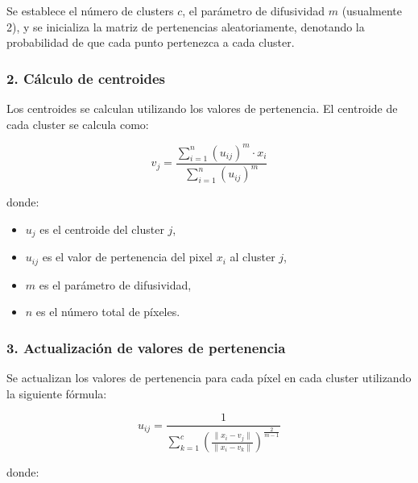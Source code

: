 Se establece el número de clusters $c$, el parámetro de difusividad $m$ (usualmente 2), y se inicializa la matriz de pertenencias aleatoriamente, denotando la probabilidad de que cada punto pertenezca a cada cluster.

\subsubsection{2. Cálculo de centroides}

Los centroides se calculan utilizando los valores de pertenencia. El centroide de cada cluster se calcula como: 

$$v_j =\frac{\sum_{i=1}^n (u_{ij} )^m \cdot x_i }{\sum_{i=1}^n (u_{ij} )^m }$$

donde:

\begin{itemize}
\setlength{\itemsep}{-1ex}
   \item{\begin{flushleft} $u_j$ es el centroide del cluster $j$, \end{flushleft}}
   \item{\begin{flushleft} $u_{ij}$ es el valor de pertenencia del pixel $x_i$ al cluster $j$, \end{flushleft}}
   \item{\begin{flushleft} $m$ es el parámetro de difusividad, \end{flushleft}}
   \item{\begin{flushleft} $n$ es el número total de píxeles. \end{flushleft}}
\end{itemize}

\subsubsection{3. Actualización de valores de pertenencia}

Se actualizan los valores de pertenencia para cada píxel en cada cluster utilizando la siguiente fórmula:

$$u_{ij} =\frac{1}{\sum_{k=1}^c {\left(\frac{\|x_i -v_j \|}{\|x_i -v_k \|}\right)}^{\frac{2}{m-1}} }$$

donde:

